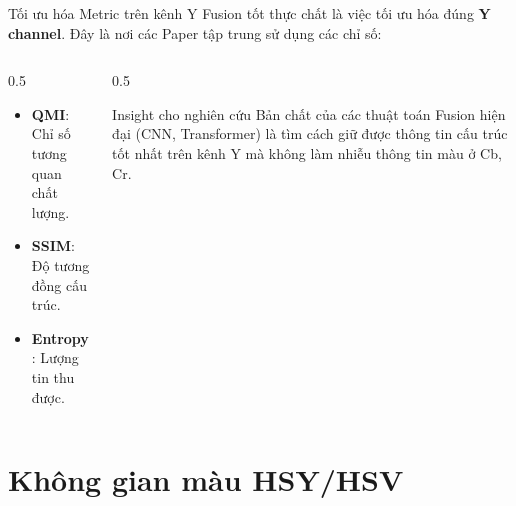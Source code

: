 \documentclass{beamer}
\begin{document}
\begin{frame}{Tối ưu hóa Metric trên kênh Y}
    Fusion tốt thực chất là việc tối ưu hóa đúng \textbf{Y channel}. Đây là nơi các Paper tập trung sử dụng các chỉ số:
    \begin{columns}
        \begin{column}{0.5\textwidth}
            \begin{itemize}
                \item \textbf{QMI}: Chỉ số tương quan chất lượng.
                \item \textbf{SSIM}: Độ tương đồng cấu trúc.
                \item \textbf{Entropy}: Lượng tin thu được.
            \end{itemize}
        \end{column}
        \begin{column}{0.5\textwidth}
            \begin{block}{Insight cho nghiên cứu}
                Bản chất của các thuật toán Fusion hiện đại (CNN, Transformer) là tìm cách giữ được thông tin cấu trúc tốt nhất trên kênh Y mà không làm nhiễu thông tin màu ở Cb, Cr.
            \end{block}
        \end{column}
    \end{columns}
\end{frame}

\section{Không gian màu HSY/HSV}
\end{document}
